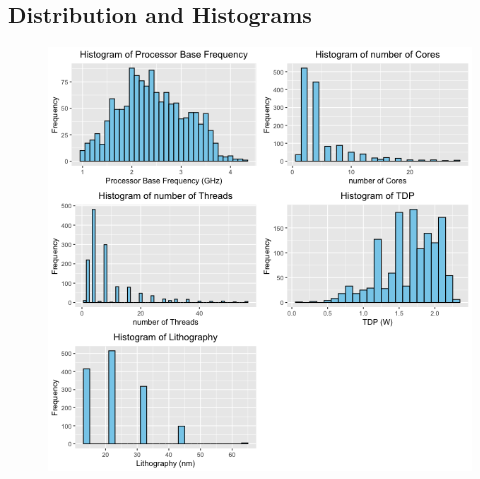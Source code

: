 \subsection{Distribution and Histograms}
\begin{figure}[H]
    \begin{center}
    \includegraphics[width=14cm]{graphics/histogram.png}
    \end{center}
\end{figure}
